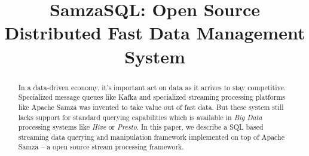 \documentclass[10pt, conference, compsocconf]{IEEEtran}
\begin{document}
%
\title{SamzaSQL: Open Source Distributed Fast Data Management System}




\author{
}

\maketitle


\begin{abstract}
In a data-driven economy, it's important act on data as it arrives to stay competitive. Specialized message queues like Kafka and specialized streaming processing platforms like Apache Samza was invented to take value out of fast data. But these system still lacks support for standard querying capabilities which is available in \textit{Big Data} processing systems like \textit{Hive} or \textit{Presto}. In this paper, we describe a SQL based streaming data querying and manipulation framework implemented on top of Apache Samza -- a open source stream processing framework.
\end{abstract}
\end{document}

